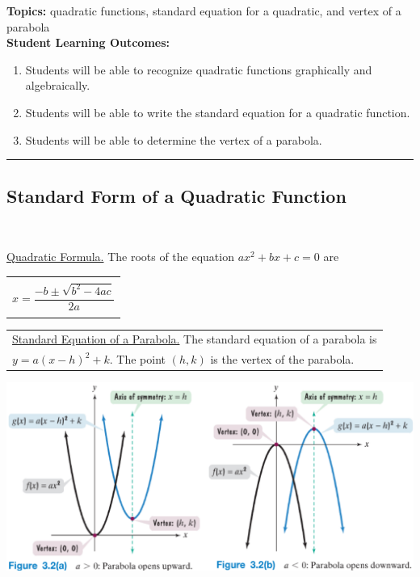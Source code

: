 

\noindent \textbf{Topics:}  quadratic functions, standard equation for  a quadratic, and vertex of a parabola\\

\noindent \textbf{Student Learning Outcomes:}
\begin{enumerate}
\item Students will be able to recognize quadratic functions graphically and algebraically.
\item Students will be able to write the standard equation for a quadratic function.
\item Students will be able to determine the vertex of a parabola.
\end{enumerate}

\hrule 

\bigskip

\subsection{Standard Form of a Quadratic Function} ~

\noindent \underline{Quadratic Formula.} The roots of the equation $ax^2+bx+c=0$ are \begin{tabular}{| l |} \hline \\ $x = \dfrac{-b \pm \sqrt{b^2-4ac}}{2a}$  \\ \\ \hline
\end{tabular} 


\hspace{-.3in}\begin{tabular}{| l |} \hline 
\noindent \underline{Standard Equation of a Parabola.} The standard equation of a parabola is \\
$ y = a(x-h)^2 + k$. The point $(h,k)$ is the vertex of the parabola.
\\ \hline
\end{tabular} 

\includegraphics[scale=.7]{graphstandard}



